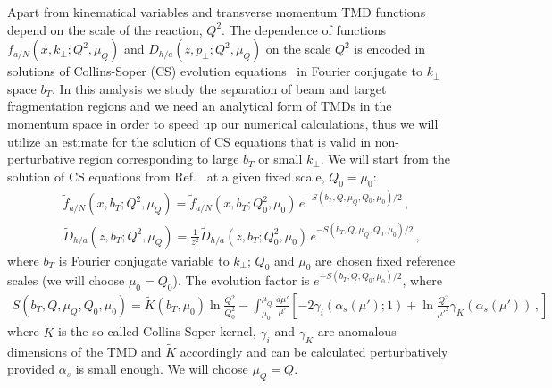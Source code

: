 \documentclass[final,3p,times,onecolumn,sort&compress,hidelinks]{elsarticle}
\newcommand\3[1]{\boldsymbol{#1}}
\begin{document}
Apart from kinematical variables and transverse momentum TMD functions depend on the scale of the reaction, $Q^2$.
The dependence of functions $f_{a/N} (x, k_{\perp}; Q^2, \mu_Q)$ and $D_{h/a}(z, p_{\perp}; Q^2, \mu_Q)$  on the scale $Q^2$ is encoded in solutions of Collins-Soper (CS) evolution equations~\cite{Collins:2011zzd} in Fourier conjugate to $k_{\perp}$ space $b_T$. In this analysis we study the separation of beam and target fragmentation regions and we need an analytical form of TMDs in the momentum space in order to speed up our numerical calculations, thus we will utilize an estimate for the solution of CS equations that is valid in non-perturbative region corresponding to large $b_T$ or small $k_\perp$. We will start from the solution of CS equations from Ref.~\cite{Collins:2014jpa} at a given fixed scale, $Q_0=\mu_0$:
\begin{eqnarray}
&&\tilde f_{a/N} (x,b_T; Q^2, \mu_Q)= \tilde f_{a/N} (x, b_T; Q_0^2, \mu_0)\,e^{-S(b_T, Q, \mu_Q, Q_0, \mu_0)/2}\,,
\label{e:PDF_ansatz}\\[0.3cm]
&&\tilde D_{h/a}(z,b_T; Q^2, \mu_Q)=\frac{1}{z^2}\tilde D_{h/a}(z, b_T; Q_0^2, \mu_0)\,e^{-S(b_T, Q, \mu_Q, Q_0, \mu_0)/2}\,,
\label{e:FF_ansatz0}
\end{eqnarray}
where $b_T$ is Fourier conjugate variable to $k_\perp$; $Q_0$ and $\mu_0$ are chosen fixed reference scales (we will choose $\mu_0 = Q_0$). The evolution factor is $e^{-S(b_T, Q, Q_0, \mu_0)/2}$, where
\begin{eqnarray}
S(b_T, Q, \mu_Q, Q_0, \mu_0) = \tilde K(b_T,\mu_0) \ln\frac{Q^2}{Q_0^2} - \int_{\mu_0}^{\mu_Q} \frac{d \mu'}{\mu'}\left[
-2 \gamma_i(\alpha_s(\mu');1) +\ln\frac{Q^2}{\mu'^2}\gamma_K(\alpha_s(\mu'))\,,
 \right]
 \label{e:FF_ansatz}
\end{eqnarray}
where $\tilde K$ is the so-called Collins-Soper kernel, $\gamma_i$ and $\gamma_K$ are anomalous dimensions of the TMD and $\tilde K$ accordingly and can be calculated perturbatively provided $\alpha_s$ is small enough. We will choose $\mu_Q = Q$. 
\end{document}
